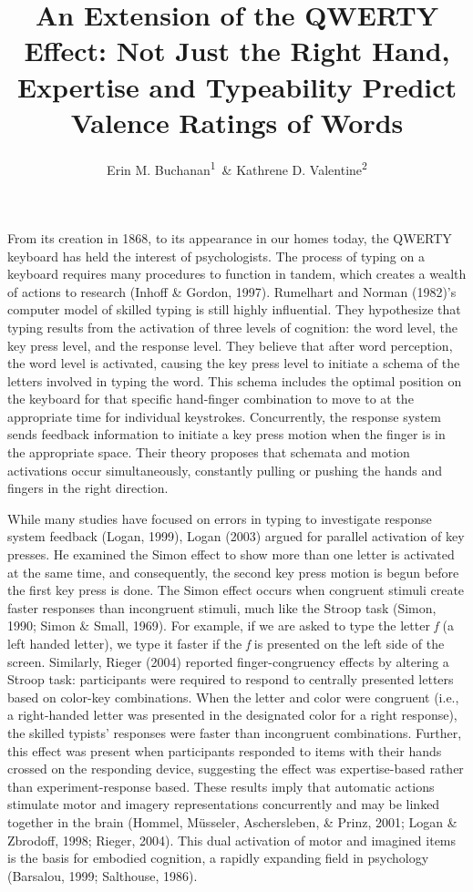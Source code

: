 \documentclass[english,man, mask]{apa6}
\title{An Extension of the QWERTY Effect: Not Just the Right Hand, Expertise
and Typeability Predict Valence Ratings of Words}
\author{Erin M. Buchanan\textsuperscript{1}~\& Kathrene D. Valentine\textsuperscript{2}}
\affiliation{
    \vspace{0.5cm}
          \textsuperscript{1} Missouri State University\\
          \textsuperscript{2} University of Missouri  }
\theoremstyle{definition}
\theoremstyle{definition}
\theoremstyle{definition}
\theoremstyle{remark}
\begin{document}
\maketitle

\setcounter{secnumdepth}{0}



From its creation in 1868, to its appearance in our homes today, the
QWERTY keyboard has held the interest of psychologists. The process of
typing on a keyboard requires many procedures to function in tandem,
which creates a wealth of actions to research (Inhoff \& Gordon, 1997).
Rumelhart and Norman (1982)'s computer model of skilled typing is still
highly influential. They hypothesize that typing results from the
activation of three levels of cognition: the word level, the key press
level, and the response level. They believe that after word perception,
the word level is activated, causing the key press level to initiate a
schema of the letters involved in typing the word. This schema includes
the optimal position on the keyboard for that specific hand-finger
combination to move to at the appropriate time for individual
keystrokes. Concurrently, the response system sends feedback information
to initiate a key press motion when the finger is in the appropriate
space. Their theory proposes that schemata and motion activations occur
simultaneously, constantly pulling or pushing the hands and fingers in
the right direction.

While many studies have focused on errors in typing to investigate
response system feedback (Logan, 1999), Logan (2003) argued for parallel
activation of key presses. He examined the Simon effect to show more
than one letter is activated at the same time, and consequently, the
second key press motion is begun before the first key press is done. The
Simon effect occurs when congruent stimuli create faster responses than
incongruent stimuli, much like the Stroop task (Simon, 1990; Simon \&
Small, 1969). For example, if we are asked to type the letter \emph{f}
(a left handed letter), we type it faster if the \emph{f} is presented
on the left side of the screen. Similarly, Rieger (2004) reported
finger-congruency effects by altering a Stroop task: participants were
required to respond to centrally presented letters based on color-key
combinations. When the letter and color were congruent (i.e., a
right-handed letter was presented in the designated color for a right
response), the skilled typists' responses were faster than incongruent
combinations. Further, this effect was present when participants
responded to items with their hands crossed on the responding device,
suggesting the effect was expertise-based rather than
experiment-response based. These results imply that automatic actions
stimulate motor and imagery representations concurrently and may be
linked together in the brain (Hommel, Müsseler, Aschersleben, \& Prinz,
2001; Logan \& Zbrodoff, 1998; Rieger, 2004). This dual activation of
motor and imagined items is the basis for embodied cognition, a rapidly
expanding field in psychology (Barsalou, 1999; Salthouse, 1986).
\end{document}
